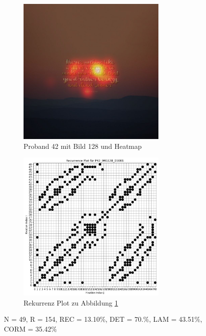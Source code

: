 \documentclass[
    language=german, %
    thesis=seminar, %
    supervisor=postdoc, %
    multiauthor=true, %
    ]{settings/csssa-thesis}
\begin{document}
\begin{figure}[ht]
    \centering
    \begin{subfigure}{0.49\textwidth}
        \centering
        \includegraphics[width=0.8\textwidth]{figures/Bild14.jpeg}
        \caption{Proband 42 mit Bild 128 und Heatmap}\label{fig:Bild13a}
    \end{subfigure}
    \begin{subfigure}{0.49\textwidth}
        \centering
        \includegraphics[width=0.8\textwidth]{figures/Bild15.jpeg}
        \caption{Rekurrenz Plot zu Abbildung \ref{fig:Bild13a}}\label{fig:Bild13b}
    \end{subfigure}\label{fig:Bild13}
    \caption{N = 49, R = 154, REC = 13.10\%, DET = 70.\%, LAM = 43.51\%, CORM = 35.42\%}
\end{figure}
\end{document}
